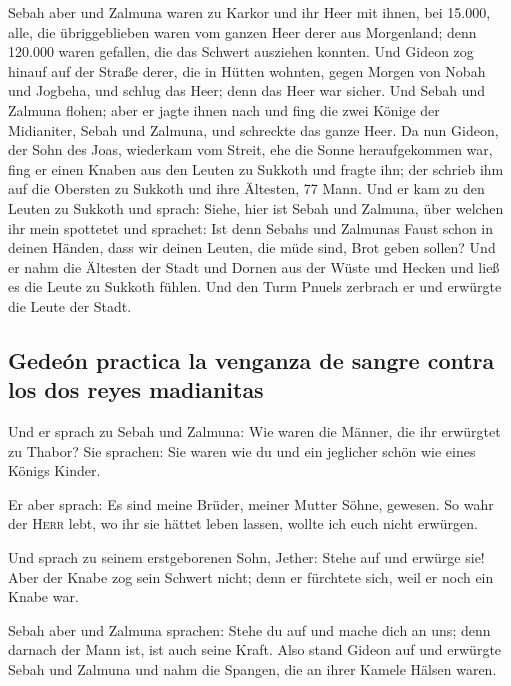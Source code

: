  Sebah aber und Zalmuna waren zu Karkor und ihr Heer mit
ihnen, bei 15.000, alle, die übriggeblieben waren vom ganzen Heer derer
aus Morgenland; denn 120.000 waren gefallen, die das Schwert ausziehen
konnten.  Und Gideon zog hinauf auf der Straße derer, die
in Hütten wohnten, gegen Morgen von Nobah und Jogbeha, und schlug das
Heer; denn das Heer war sicher.  Und Sebah und Zalmuna
flohen; aber er jagte ihnen nach und fing die zwei Könige der
Midianiter, Sebah und Zalmuna, und schreckte das ganze Heer.
 Da nun Gideon, der Sohn des Joas, wiederkam vom Streit,
ehe die Sonne heraufgekommen war,  fing er einen Knaben
aus den Leuten zu Sukkoth und fragte ihn; der schrieb ihm auf die
Obersten zu Sukkoth und ihre Ältesten, 77 Mann.  Und er
kam zu den Leuten zu Sukkoth und sprach: Siehe, hier ist Sebah und
Zalmuna, über welchen ihr mein spottetet und sprachet: Ist denn Sebahs
und Zalmunas Faust schon in deinen Händen, dass wir deinen Leuten, die
müde sind, Brot geben sollen?  Und er nahm die Ältesten
der Stadt und Dornen aus der Wüste und Hecken und ließ es die Leute zu
Sukkoth fühlen.  Und den Turm Pnuels zerbrach er und
erwürgte die Leute der Stadt.

\hypertarget{gedeuxf3n-practica-la-venganza-de-sangre-contra-los-dos-reyes-madianitas}{%
\subsection{Gedeón practica la venganza de sangre contra los dos reyes
madianitas}\label{gedeuxf3n-practica-la-venganza-de-sangre-contra-los-dos-reyes-madianitas}}

 Und er sprach zu Sebah und Zalmuna: Wie waren die
Männer, die ihr erwürgtet zu Thabor? Sie sprachen: Sie waren wie du und
ein jeglicher schön wie eines Königs Kinder.

 Er aber sprach: Es sind meine Brüder, meiner Mutter
Söhne, gewesen. So wahr der \textsc{Herr} lebt, wo ihr sie hättet leben
lassen, wollte ich euch nicht erwürgen.

 Und sprach zu seinem erstgeborenen Sohn, Jether: Stehe
auf und erwürge sie! Aber der Knabe zog sein Schwert nicht; denn er
fürchtete sich, weil er noch ein Knabe war.

 Sebah aber und Zalmuna sprachen: Stehe du auf und mache
dich an uns; denn darnach der Mann ist, ist auch seine Kraft. Also stand
Gideon auf und erwürgte Sebah und Zalmuna und nahm die Spangen, die an
ihrer Kamele Hälsen waren.

